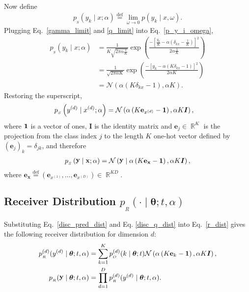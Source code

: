 \documentclass[11pt,table]{article}
\DeclareMathOperator{\x}{\mathbf{x}}
\DeclareMathOperator{\y}{\mathbf{y}}
\newcommand{\N}[2]{\mathcal{N}\left(#1 , #2\right)}
\DeclareMathOperator{\R}{\mathbb{R}}
\newcommand{\I}[1]{\boldsymbol{I}}
\newcommand*{\defeq}{\stackrel{\text{def}}{=}}
\newcommand{\didx}[2]{#1^{(#2)}}
\renewcommand{\vec}[1]{\boldsymbol{#1}}
\newcommand{\pars}{\theta}
\newcommand{\parsn}{\vec{\pars}}
\newcommand{\0}[1]{\constvec{0}{#1}}
\newcommand{\1}[1]{\constvec{1}{#1}}
\newcommand{\yd}{y}
\newcommand{\ydd}[1]{\didx{\yd}{#1}}
\newcommand{\xdd}[1]{\didx{x}{#1}}
\newcommand{\oh}[2]{\mathbf{e}_{#1}}
\newcommand{\sender}[2]{p_{_S}\left(#1 \mid #2\right)}
\newcommand{\out}{p_{_O}}
\newcommand{\rec}{p_{_R}}
\begin{document}
Now define
\begin{align}
\sender{y_k}{x;\alpha} \defeq \lim_{\omega \rightarrow 0}p(y_k \mid x,\omega).
\end{align}
Plugging Eq.~\ref{gamma_limit} and \ref{q_limit} into Eq.~\ref{p_y_i_omega},
\begin{align}
\sender{y_k}{x;\alpha} &= \frac{1}{K\sqrt{2\pi \alpha \frac{1}{K}}}\exp\left(\frac{-\left[\frac{y_k}{K} - \alpha\left(\delta_{k x} - \frac{1}{K}\right)\right]^2}{2\alpha \frac{1}{K}}\right)\\
&= \frac{1}{\sqrt{2\pi \alpha K}}\exp\left(\frac{-\left[y_k - \alpha\left(K\delta_{k x} - 1\right)\right]^2}{2\alpha K}\right)\\
&= \N{\alpha\left(K\delta_{k x} - 1\right)}{\alpha K}\label{y_i_dist}.
\end{align}
Restoring the superscript,
\begin{align}
\sender{\ydd{d}}{\xdd{d};\alpha} &= \N{\alpha\left(K \oh{\xdd{d}}{K}- \1{K}\right)}{\alpha K \I{K}}\label{disc_q_def_uni},
\end{align}
where $\1{K}$ is a vector of ones, $\I{K}$ is the identity matrix and $\oh{j}{K}\in \R^{K}$ is the projection from the class index $j$ to the length $K$ one-hot vector defined by $(\oh{j}{K})_k = \delta_{j k}$, and therefore
\begin{align}
\sender{\y}{\x;\alpha} = \N{\y \mid \alpha\left(K \oh{\x}{KD} - \1{KD}\right)}{\alpha K \I{KD}}\label{disc_q_dist},
\end{align}
where $\oh{\x}{KD} \defeq \left(\oh{\xdd{1}}{K},\dots,\oh{\xdd{D}}{K}\right) \in \R^{KD}$.
\subsection{Receiver Distribution \texorpdfstring{$\rec(\cdot \mid \parsn; t, \alpha)$}{}}
Substituting Eq.~\ref{disc_pred_dist} and Eq. \ref{disc_q_dist} into Eq.~\ref{r_dist} gives the following receiver distribution for dimension $d$:
\begin{align}
\rec^{(d)}(\ydd{d} \mid \parsn; t, \alpha) &= \sum_{k=1}^K \out^{(d)}(k \mid \parsn; t) \N{\alpha\left(K \oh{k}{K}- \1{K}\right)}{\alpha K \I{K}}\label{disc_r_dist_uni},\\
\rec(\y \mid \parsn; t, \alpha) &= \prod_{d=1}^D \rec^{(d)}(\ydd{d} \mid \parsn; t, \alpha).\label{disc_r_dist}
\end{align}
\end{document}
